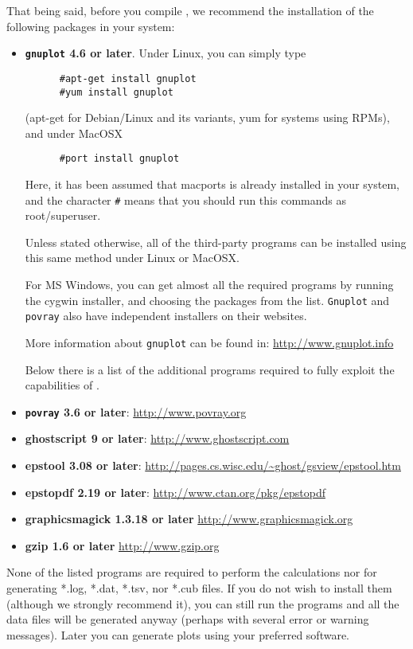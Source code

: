 That being said, before you compile \DTK{}, we recommend the installation of the following packages
in your system:
\begin{itemize}
   \item \textbf{\texttt{gnuplot} 4.6 or later}. Under Linux, you can simply type
   \begin{verbatim}
      #apt-get install gnuplot
      #yum install gnuplot
   \end{verbatim}
   (apt-get for Debian/Linux and its variants, yum for systems using RPMs), and under MacOSX
   \begin{verbatim}
      #port install gnuplot
   \end{verbatim}
   Here, it has been assumed that macports is already installed in your system, and the character \texttt{\#} means that you should run this commands as root/superuser.
   
Unless stated otherwise, all of the third-party programs can be installed using this same method
under Linux or MacOSX.

For MS Windows, you can get almost all the required programs by running the cygwin installer,
and choosing the packages from the list. \texttt{Gnuplot} and \texttt{povray} also have independent
installers on their websites.

More information about \texttt{gnuplot} can be found in: \url{http://www.gnuplot.info}

Below there is a list of the additional programs required to fully exploit the capabilities of \DTK.

   \item \textbf{\texttt{povray} 3.6 or later}: \url{http://www.povray.org}
   \item \textbf{ghostscript 9 or later}: \url{http://www.ghostscript.com}
   \item \textbf{epstool 3.08 or later}: \url{http://pages.cs.wisc.edu/~ghost/gsview/epstool.htm}
   \item \textbf{epstopdf 2.19 or later}: \url{http://www.ctan.org/pkg/epstopdf}
   \item \textbf{graphicsmagick 1.3.18 or later} \url{http://www.graphicsmagick.org}
   \item \textbf{gzip 1.6 or later} \url{http://www.gzip.org}
\end{itemize}

None of the listed programs are required to perform the calculations nor for generating *.log, *.dat, *.tsv, nor *.cub files. If you do not wish to install them (although we strongly recommend it), you can still run the programs and all the data files will be generated anyway (perhaps with several error or warning messages). Later you can generate plots using your preferred software.

